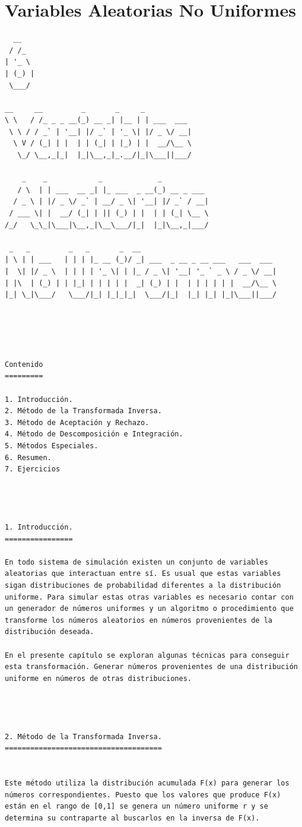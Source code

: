 \chapter{Variables Aleatorias No Uniformes}
\begin{verbatim}
  __
 / /_
| '_ \
| (_) |
 \___/

__     __         _       _     _
\ \   / /_ _ _ __(_) __ _| |__ | | ___  ___
 \ \ / / _` | '__| |/ _` | '_ \| |/ _ \/ __|
  \ V / (_| | |  | | (_| | |_) | |  __/\__ \
   \_/ \__,_|_|  |_|\__,_|_.__/|_|\___||___/

    _    _            _             _
   / \  | | ___  __ _| |_ ___  _ __(_) __ _ ___
  / _ \ | |/ _ \/ _` | __/ _ \| '__| |/ _` / __|
 / ___ \| |  __/ (_| | || (_) | |  | | (_| \__ \
/_/   \_\_|\___|\__,_|\__\___/|_|  |_|\__,_|___/

 _   _         _   _       _  __
| \ | | ___   | | | |_ __ (_)/ _| ___  _ __ _ __ ___   ___  ___
|  \| |/ _ \  | | | | '_ \| | |_ / _ \| '__| '_ ` _ \ / _ \/ __|
| |\  | (_) | | |_| | | | | |  _| (_) | |  | | | | | |  __/\__ \
|_| \_|\___/   \___/|_| |_|_|_|  \___/|_|  |_| |_| |_|\___||___/





Contenido
=========

1. Introducción.
2. Método de la Transformada Inversa.
3. Método de Aceptación y Rechazo.
4. Método de Descomposición e Integración.
5. Métodos Especiales.
6. Resumen.
7. Ejercicios




1. Introducción.
================

En todo sistema de simulación existen un conjunto de variables aleatorias que interactuan entre sí. Es usual que estas variables sigan distribuciones de probabilidad diferentes a la distribución uniforme. Para simular estas otras variables es necesario contar con un generador de números uniformes y un algoritmo o procedimiento que transforme los números aleatorios en números provenientes de la distribución deseada. 

En el presente capítulo se exploran algunas técnicas para conseguir esta transformación. Generar números provenientes de una distribución uniforme en números de otras distribuciones.




2. Método de la Transformada Inversa.
=====================================


Este método utiliza la distribución acumulada F(x) para generar los números correspondientes. Puesto que los valores que produce F(x) están en el rango de [0,1] se genera un número uniforme r y se determina su contraparte al buscarlos en la inversa de F(x).



\end{verbatim}
